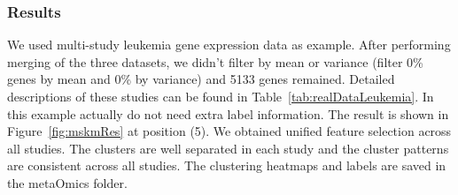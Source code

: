 \subsubsection{Results}

We used multi-study leukemia gene expression data as example.
After performing merging of the three datasets, we didn't filter by mean or variance (filter 0\% genes by mean and 0\% by variance) and 5133 genes remained.
Detailed descriptions of these studies can be found in Table~\ref{tab:realDataLeukemia}. 
In this example actually do not need extra label information.
The result is shown in Figure~\ref{fig:mskmRes} at position {\color{red} (5)}.
We obtained unified feature selection across all studies.
The clusters are well separated in each study and the cluster patterns are consistent across all studies.
The clustering heatmaps and labels are saved in the metaOmics folder.










